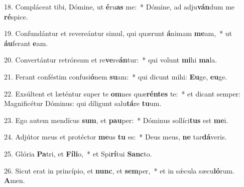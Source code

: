 18. Compláceat tibi, Dómine, ut \textbf{é}ru\textbf{as} me:~*  Dómine, ad adju\textbf{ván}dum me \textbf{ré}spice.\

19. Confundántur et revereántur simul, qui quærunt \textbf{á}nimam \textbf{me}am,~*  ut \textbf{áu}ferant \textbf{e}am.\

20. Convertántur retrórsum et re\textbf{ve}re\textbf{án}tur:~*  qui volunt \textbf{mi}hi \textbf{ma}la.\

21. Ferant conféstim confusi\textbf{ó}nem \textbf{su}am:~*  qui dicunt mihi: \textbf{Eu}ge, \textbf{eu}ge.\

22. Exsúltent et læténtur super te \textbf{om}nes quæ\textbf{rén}\textbf{tes} te:~*  et dicant semper: Magnificétur Dóminus: qui díligunt salu\textbf{tá}re \textbf{tu}um.\

23. Ego autem mendícus \textbf{sum}, et \textbf{pau}per:~*  Dóminus sollíci\textbf{tus} est \textbf{me}i.\

24. Adjútor meus et protéctor \textbf{me}us \textbf{tu} es:~*  Deus meus, \textbf{ne} tar\textbf{dá}veris.\

25. Glória \textbf{Pa}tri, et \textbf{Fí}\textbf{li}o,~*  et Spi\textbf{rí}tui \textbf{Sanc}to.\

26. Sicut erat in princípio, et \textbf{nunc}, et \textbf{sem}per,~*  et in sǽcula sæcu\textbf{ló}rum. \textbf{A}men.\

